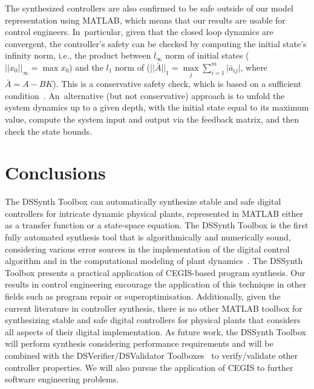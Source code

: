 \documentclass[10pt,conference]{IEEEtran}
\newcommand\tool{{DSSynth Toolbox}\xspace}
\begin{document}
The synthesized controllers are also confirmed to be safe outside of our model
representation using MATLAB, which means that our results are usable for control engineers. 
In~particular, given that the closed loop dynamics are convergent, 
the controller's safety can be checked by computing the initial state's infinity norm, i.e., 
the product between $l_{\infty}$ norm of initial states ($\vert\vert{x_{0}}\vert\vert_{\infty}=\max{x_{0}}$) 
and the $l_{1}$ norm of ($\vert\vert{\bar{A}}\vert\vert_{1}=\max\limits_{j}{\sum\limits_{i=1}^{m} \vert \bar{a}_{ij} \vert}$, 
where $\bar{A}=A-BK$). This is a conservative safety check, which is based on a sufficient condition~\cite{toscano2013structured}. 
An~alternative (but not conservative) approach is to unfold the system dynamics up to a given depth, 
with the initial state equal to its maximum value, compute the system input and output via the feedback matrix, 
and then check the state bounds. 


\section{Conclusions}

The \tool can automatically synthesize stable and safe digital controllers
for intricate dynamic physical plants, represented in MATLAB either as a
transfer function or a state-space equation.  The \tool is the first fully
automated synthesis tool that is algorithmically and numerically sound,
considering various error sources in the implementation of the digital
control algorithm and in the computational modeling of plant
dynamics~\cite{abate2017, abatecav2017}.
%
The \tool presents a practical application of CEGIS-based program synthesis.
Our results in control engineering encourage the application
of this technique in other fields such as program repair or superoptimisation.
%
Additionally, given the current literature in controller synthesis, there is
no other MATLAB toolbox for synthesizing stable and safe digital controllers
for physical plants that considers all aspects of their digital
implementation.
%
As future work, the \tool will perform synthesis considering performance
requirements and will be combined with the
DSVerifier/DSValidator Toolboxes~\cite{issta2017,dsvalidator} to
verify/validate other controller properties.
We will also pursue the application of CEGIS to further software
engineering problems.


 
\end{document}
